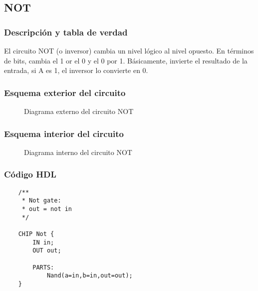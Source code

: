 \documentclass[12pt]{article}
\begin{document}
    \subsection{NOT}
        \subsubsection{Descripción y tabla de verdad}
            El circuito NOT (o inversor) cambia un nivel lógico al nivel opuesto. En términos de bits, cambia el 1 or el 0 y el 0 por 1. 
            Básicamente, invierte el resultado de la entrada, si A es 1, el inversor lo convierte en 0. 
            \begin{table}[H]
            \centering
            \caption{Tabla de verdad de NOT}
            \label{tab:not}
            \end{table}
        \subsubsection{Esquema exterior del circuito}
            \begin{figure}[H]
                \centering
                
                \caption{Diagrama externo del circuito NOT} \cite{diagram}
                \label{fig:enter-label}
            \end{figure}
        \subsubsection{Esquema interior del circuito}
            \begin{figure}[H]
                \centering
                
                \caption{Diagrama interno del circuito NOT} \cite{diagram}
                \label{fig:enter-label}
            \end{figure}
        \newpage \subsubsection{Código HDL}
            \begin{lstlisting}
    /**
     * Not gate:
     * out = not in
     */
    
    CHIP Not {
        IN in;
        OUT out;
    
        PARTS:
            Nand(a=in,b=in,out=out);
    }
            \end{lstlisting}
    \newpage
\end{document}
